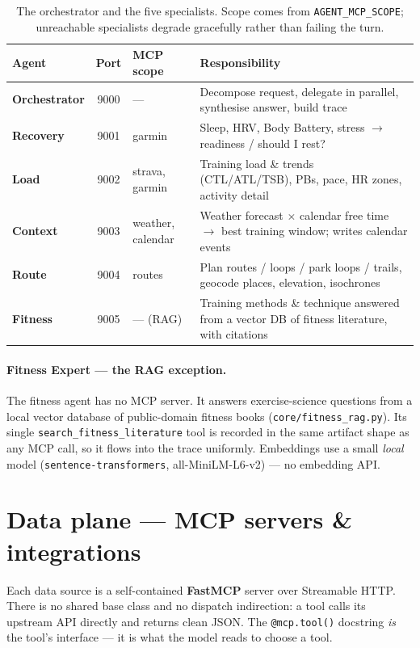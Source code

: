 \documentclass[11pt,a4paper]{article}
\newcommand{\code}[1]{{\small\texttt{#1}}}
\begin{document}
\begin{table}[ht]\centering\footnotesize
\renewcommand{\arraystretch}{1.25}
\begin{tabular}{@{}>{\bfseries}l c l p{7.4cm}@{}}
\toprule
\normalfont\textbf{Agent} & \textbf{Port} & \textbf{MCP scope} & \textbf{Responsibility} \\
\midrule
Orchestrator & 9000 & --- & Decompose request, delegate in parallel, synthesise answer, build trace \\
Recovery     & 9001 & garmin & Sleep, HRV, Body Battery, stress $\rightarrow$ readiness / should I rest? \\
Load         & 9002 & strava, garmin & Training load \& trends (CTL/ATL/TSB), PBs, pace, HR zones, activity detail \\
Context      & 9003 & weather, calendar & Weather forecast $\times$ calendar free time $\rightarrow$ best training window; writes calendar events \\
Route        & 9004 & routes & Plan routes / loops / park loops / trails, geocode places, elevation, isochrones \\
Fitness      & 9005 & --- (RAG) & Training methods \& technique answered from a vector DB of fitness literature, with citations \\
\bottomrule
\end{tabular}
\caption{The orchestrator and the five specialists. Scope comes from \code{AGENT\_MCP\_SCOPE};
unreachable specialists degrade gracefully rather than failing the turn.}
\end{table}

\paragraph{Fitness Expert --- the RAG exception.} The fitness agent has no MCP server. It
answers exercise-science questions from a local vector database of public-domain fitness
books (\code{core/fitness\_rag.py}). Its single \code{search\_fitness\_literature} tool is
recorded in the same artifact shape as any MCP call, so it flows into the trace uniformly.
Embeddings use a small \emph{local} model (\code{sentence-transformers}, all-MiniLM-L6-v2)
--- no embedding API.

\section{Data plane --- MCP servers \& integrations}
Each data source is a self-contained \textbf{FastMCP} server over Streamable HTTP. There is
no shared base class and no dispatch indirection: a tool calls its upstream API directly and
returns clean JSON. The \code{@mcp.tool()} docstring \emph{is} the tool's interface --- it is
what the model reads to choose a tool.
\end{document}
